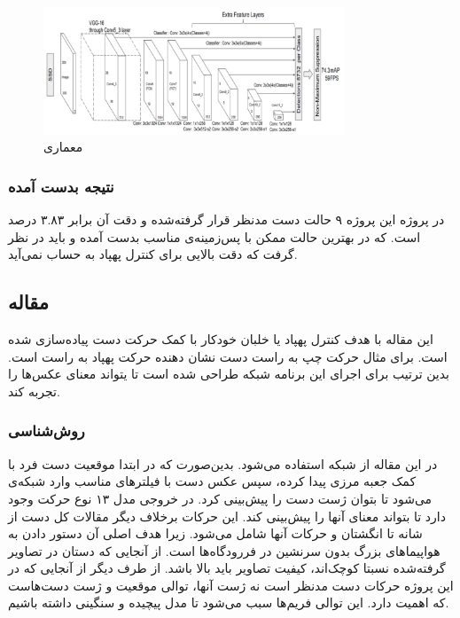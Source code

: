\begin{figure}[h]
    \centering
    \includegraphics[width=0.8\textwidth]{VGG16.png}
    \caption{معماری }
\end{figure}

\subsubsection{نتیجه بدست آمده}
 در پروژه این پروژه ۹ حالت دست مدنظر قرار گرفته‌شده و دقت آن برابر ۳.۸۳ درصد است.
 که در بهترین حالت ممکن با پس‌زمینه‌ی مناسب بدست آمده و باید در نظر گرفت که دقت بالایی برای کنترل پهپاد به حساب نمی‌آید.
\cite{hadri2018hand}

\subsection{مقاله }
این مقاله با هدف کنترل پهپاد یا خلبان خودکار با کمک حرکت دست پیاده‌سازی شده است. برای مثال حرکت چپ به راست دست نشان دهنده حرکت پهپاد به راست است. بدین ترتیب برای اجرای این برنامه شبکه  طراحی شده است تا یتواند معنای عکس‌ها را تجربه کند.

\subsubsection{روش‌شناسی}
در این مقاله از شبکه‌‌  استفاده می‌شود. بدین‌صورت که در ابتدا موقعیت دست فرد با کمک جعبه مرزی  پیدا کرده، سپس عکس دست با فیلترهای مناسب وارد شبکه‌ی  می‌شود تا بتوان ژست دست را پیش‌بینی کرد. در خروجی مدل ۱۳ نوع حرکت وجود دارد تا بتواند معنای آنها را پیش‌بینی کند. این حرکات برخلاف دیگر مقالات کل دست از شانه تا انگشتان و حرکات آنها شامل می‌شود. زیرا هدف اصلی آن دستور دادن به هواپیما‌های
 بزرگ بدون سرنشین در فررودگاه‌ها است. از آنجایی که دستان در تصاویر گرفته‌شده نسبتا کوچک‌اند، کیفیت تصاویر باید بالا باشد. از طرف دیگر از آنجایی که در این پروژه حرکات دست مدنظر است نه ژست آنها، توالی موقعیت و ژست دست‌هاست که اهمیت دارد. این توالی فریم‌ها سبب می‌شود تا مدل پیچیده و سنگینی داشته باشیم.

